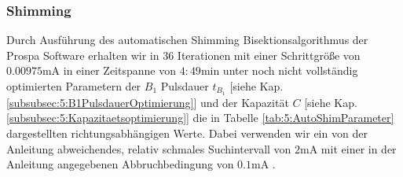 \documentclass{article}
\begin{document}
        \subsubsection*{Shimming}

            Durch Ausführung des automatischen Shimming Bisektionsalgorithmus der Prospa Software \cite[ch. 2.4.3]{doc:EFNMRStudentManual} erhalten wir in $36$ Iterationen mit einer Schrittgröße von $0.00975\si{\milli\ampere}$ in einer Zeitspanne von $4:49$min unter noch nicht vollständig optimierten Parametern der $B_1$ Pulsdauer $t_{B_1}$ [siehe Kap. \ref{subsubsec:5:B1PulsdauerOptimierung}] und der Kapazität $C$ [siehe Kap. \ref{subsubsec:5:Kapazitaetsoptimierung}] die in Tabelle \ref{tab:5:AutoShimParameter} dargestellten richtungsabhängigen Werte. Dabei verwenden wir ein von der Anleitung abweichendes, relativ schmales Suchintervall von $2\si{\milli\ampere}$ mit einer in der Anleitung angegebenen Abbruchbedingung von $0.1\si{\milli\ampere}$ \cite[ch 2.4.3]{doc:EFNMRStudentManual}. 
\end{document}
